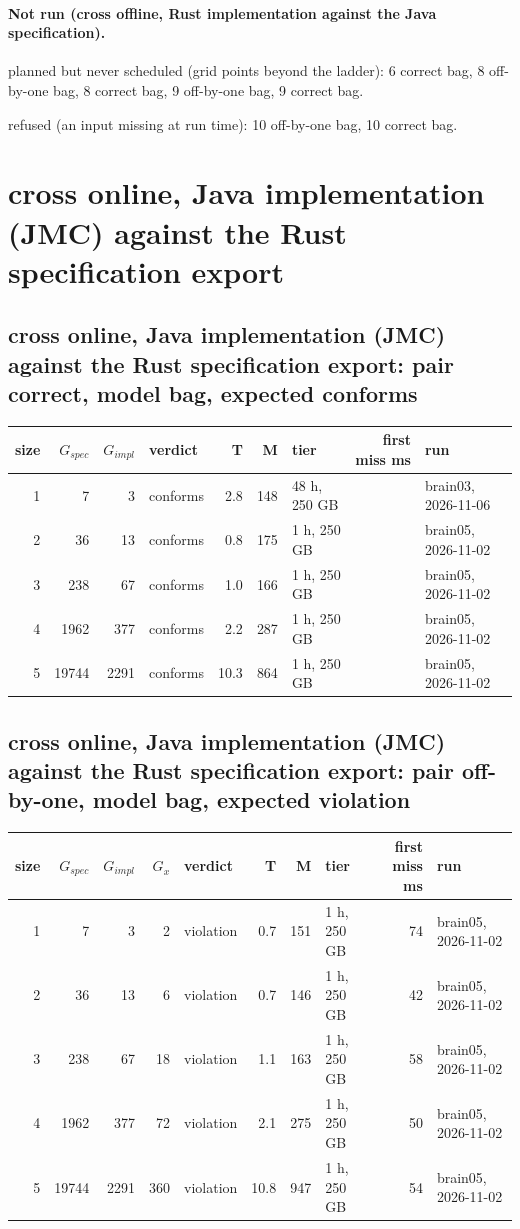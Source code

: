 \documentclass[10pt]{article}
\begin{document}
\paragraph{Not run (cross offline, Rust implementation against the Java specification).}
planned but never scheduled (grid points beyond the ladder): 6 correct bag, 8 off-by-one bag, 8 correct bag, 9 off-by-one bag, 9 correct bag.\par
refused (an input missing at run time): 10 off-by-one bag, 10 correct bag.\par
\section*{cross online, Java implementation (JMC) against the Rust specification export}
\subsection*{cross online, Java implementation (JMC) against the Rust specification export: pair \textsf{correct}, model bag, expected conforms}
\begin{longtable}{@{}rrrlrrlrl@{}}
\toprule
size & $G_{\mathit{spec}}$ & $G_{\mathit{impl}}$ & verdict & T & M & tier & first miss ms & run \\
\midrule
\endhead
\color{blue} 1 & 7 & 3 & conforms & 2.8 & 148 & 48 h, 250 GB &  & brain03, 2026-11-06 \\
\color{red} 2 & 36 & 13 & conforms & 0.8 & 175 & 1 h, 250 GB &  & brain05, 2026-11-02 \\
\color{red} 3 & 238 & 67 & conforms & 1.0 & 166 & 1 h, 250 GB &  & brain05, 2026-11-02 \\
\color{red} 4 & 1962 & 377 & conforms & 2.2 & 287 & 1 h, 250 GB &  & brain05, 2026-11-02 \\
\color{red} 5 & 19744 & 2291 & conforms & 10.3 & 864 & 1 h, 250 GB &  & brain05, 2026-11-02 \\
\bottomrule
\end{longtable}
\subsection*{cross online, Java implementation (JMC) against the Rust specification export: pair \textsf{off-by-one}, model bag, expected violation}
\begin{longtable}{@{}rrrrlrrlrl@{}}
\toprule
size & $G_{\mathit{spec}}$ & $G_{\mathit{impl}}$ & $G_x$ & verdict & T & M & tier & first miss ms & run \\
\midrule
\endhead
\color{red} 1 & 7 & 3 & 2 & violation & 0.7 & 151 & 1 h, 250 GB & 74 & brain05, 2026-11-02 \\
\color{red} 2 & 36 & 13 & 6 & violation & 0.7 & 146 & 1 h, 250 GB & 42 & brain05, 2026-11-02 \\
\color{red} 3 & 238 & 67 & 18 & violation & 1.1 & 163 & 1 h, 250 GB & 58 & brain05, 2026-11-02 \\
\color{red} 4 & 1962 & 377 & 72 & violation & 2.1 & 275 & 1 h, 250 GB & 50 & brain05, 2026-11-02 \\
\color{red} 5 & 19744 & 2291 & 360 & violation & 10.8 & 947 & 1 h, 250 GB & 54 & brain05, 2026-11-02 \\
\bottomrule
\end{longtable}
\end{document}
